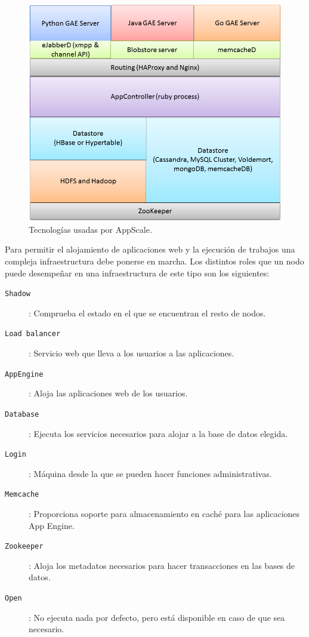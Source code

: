 
\begin{figure} [!htbp]
  \centering
  \includegraphics[width=13.5cm]{imagenes/AppScale_Stack.png}
  \caption{Tecnologías usadas por AppScale.}
\label{figure:tecnologias-appscale}
\end{figure}

Para permitir el alojamiento de aplicaciones web y la ejecución de trabajos una compleja infraestructura debe ponerse en marcha. Los distintos roles que un nodo puede desempeñar en una infraestructura de este tipo son los siguientes:

\begin{description}
\item[\texttt{Shadow}]: Comprueba el estado en el que se encuentran el resto de nodos.
\item[\texttt{Load balancer}]: Servicio web que lleva a los usuarios a las aplicaciones.
\item[\texttt{AppEngine}]: Aloja las aplicaciones web de los usuarios.
\item[\texttt{Database}]: Ejecuta los servicios necesarios para alojar a la base de datos elegida.
\item[\texttt{Login}]: Máquina desde la que se pueden hacer funciones administrativas.
\item[\texttt{Memcache}]: Proporciona soporte para almacenamiento en caché para las aplicaciones App Engine.
\item[\texttt{Zookeeper}]: Aloja los metadatos necesarios para hacer transacciones en las bases de datos.
\item[\texttt{Open}]: No ejecuta nada por defecto, pero está disponible en caso de que sea necesario.
\end{description}

